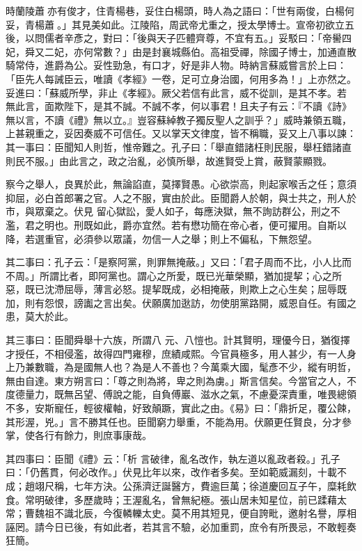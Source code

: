 \begin{pinyinscope}
 時蘭陵蕭亦有俊才，住青楊巷，妥住白楊頭，時人為之語曰：「世有兩俊，白楊何妥，青楊蕭。」其見美如此。江陵陷，周武帝尤重之，授太學博士。宣帝初欲立五後，以問儒者辛彥之，對曰：「後與天子匹體齊尊，不宜有五。」妥駁曰：「帝嚳四妃，舜又二妃，亦何常數？」由是封襄城縣伯。高祖受禪，除國子博士，加通直散騎常侍，進爵為公。妥性勁急，有口才，好是非人物。時納言蘇威嘗言於上曰：「臣先人每誡臣云，唯讀《孝經》一卷，足可立身治國，何用多為！」上亦然之。妥進曰：「蘇威所學，非止《孝經》。厥父若信有此言，威不從訓，是其不孝。若
 無此言，面欺陛下，是其不誠。不誠不孝，何以事君！且夫子有云：『不讀《詩》無以言，不讀《禮》無以立。』豈容蘇綽教子獨反聖人之訓乎？」威時兼領五職，上甚親重之，妥因奏威不可信任。又以掌天文律度，皆不稱職，妥又上八事以諫：其一事曰：臣聞知人則哲，惟帝難之。孔子曰：「舉直錯諸枉則民服，舉枉錯諸直則民不服。」由此言之，政之治亂，必慎所舉，故進賢受上賞，蔽賢蒙顯戮。



 察今之舉人，良異於此，無論諂直，莫擇賢愚。心欲崇高，則起家喉舌之任；意須抑屈，必白首郎署之官。人之不服，實由於此。臣聞爵人於朝，與士共之，刑人於市，與眾棄之。伏見
 留心獄訟，愛人如子，每應決獄，無不詢訪群公，刑之不濫，君之明也。刑既如此，爵亦宜然。若有懋功簡在帝心者，便可擢用。自斯以降，若選重官，必須參以眾議，勿信一人之舉；則上不偏私，下無怨望。



 其二事曰：孔子云：「是察阿黨，則罪無掩蔽。」又曰：「君子周而不比，小人比而不周。」所謂比者，即阿黨也。謂心之所愛，既已光華榮顯，猶加提挈；心之所惡，既已沈滯屈辱，薄言必怒。提挈既成，必相掩蔽，則欺上之心生矣；屈辱既加，則有怨恨，謗讟之言出矣。伏願廣加逖訪，勿使朋黨路開，威恩自任。有國之患，莫大於此。



 其三事曰：臣聞舜舉十六族，所謂八
 元、八愷也。計其賢明，理優今日，猶復擇才授任，不相侵濫，故得四門雍穆，庶績咸熙。今官員極多，用人甚少，有一人身上乃兼數職，為是國無人也？為是人不善也？今萬乘大國，髦彥不少，縱有明哲，無由自達。東方朔言曰：「尊之則為將，卑之則為虜。」斯言信矣。今當官之人，不度德量力，既無呂望、傅說之能，自負傅巖、滋水之氣，不慮憂深責重，唯畏總領不多，安斯寵任，輕彼權軸，好致顛蹶，實此之由。《易》曰：「鼎折足，覆公餗，其形渥，兇。」言不勝其任也。臣聞窮力舉重，不能為用。伏願更任賢良，分才參掌，使各行有餘力，則庶事康哉。



 其四事曰：臣聞《禮》云：「析
 言破律，亂名改作，執左道以亂政者殺。」孔子曰：「仍舊貫，何必改作。」伏見比年以來，改作者多矣。至如範威漏刻，十載不成；趙翊尺稱，七年方決。公孫濟迂誕醫方，費逾巨萬；徐道慶回互子午，糜耗飲食。常明破律，多歷歲時；王渥亂名，曾無紀極。張山居未知星位，前已蹂藉太常；曹魏祖不識北辰，今復轔轢太史。莫不用其短見，便自誇毗，邀射名譽，厚相誣罔。請今日已後，有如此者，若其言不驗，必加重罰，庶令有所畏忌，不敢輕奏狂簡。




\end{pinyinscope}
